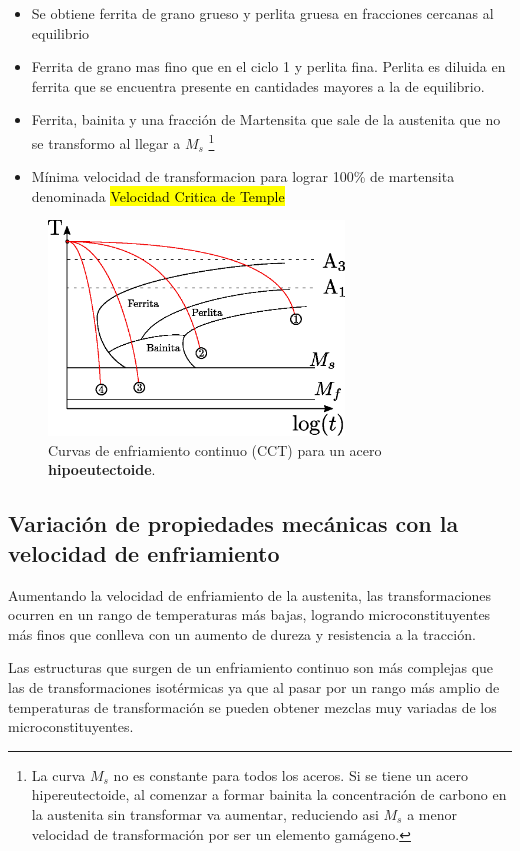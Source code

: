 \begin{itemize}
    \item[Ciclo 1] Se obtiene ferrita de grano grueso y perlita gruesa en fracciones cercanas al equilibrio
    \item[Ciclo 2] Ferrita de grano mas fino que en el ciclo 1 y perlita fina. Perlita es diluida en ferrita que se encuentra presente en cantidades mayores a la de equilibrio. 
    \item[Ciclo 3] Ferrita, bainita y una fracción de Martensita que sale de la austenita que no se transformo al llegar a $M_s$ \footnote{La curva $M_s$ no es constante para todos los aceros. Si se tiene un acero hipereutectoide, al comenzar a formar bainita la concentración de carbono en la austenita sin transformar va aumentar, reduciendo asi $M_s$ a menor velocidad de transformación por ser un elemento gamágeno.}
    \item[Ciclo 4] Mínima velocidad de transformacion para lograr 100\% de martensita denominada \hl{Velocidad Critica de Temple}
\end{itemize}

\begin{figure}[htb!]
    \centering
    \includegraphics[width=0.7\textwidth]{fig/CCThipo.eps}
    \caption{Curvas de enfriamiento continuo (CCT) para un acero \textbf{hipoeutectoide}.}
    \label{fig:CCThipo}
\end{figure}

\subsection{Variación de propiedades mecánicas con la velocidad de enfriamiento}
Aumentando la velocidad de enfriamiento de la austenita, las transformaciones ocurren en un rango de temperaturas más bajas, logrando microconstituyentes más finos que conlleva con un aumento de dureza y resistencia a la tracción. 

Las estructuras que surgen de un enfriamiento continuo son más complejas que las de transformaciones isotérmicas ya que al pasar por un rango más amplio de temperaturas de transformación se pueden obtener mezclas muy variadas de los microconstituyentes.